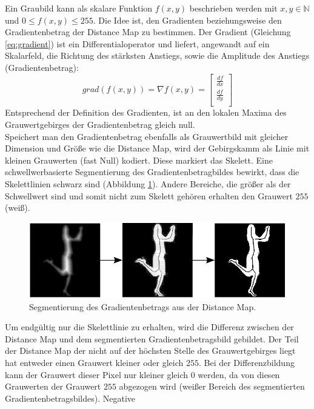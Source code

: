 Ein Graubild kann als skalare Funktion $f(x,y)$ beschrieben werden mit $x,y \in \mathbb{N}$ und
$0 \leq f(x,y) \leq 255$. 
Die Idee ist, den Gradienten beziehungsweise den Gradientenbetrag der Distance Map zu bestimmen. Der Gradient (Gleichung \ref{eq:gradient}) ist ein Differentialoperator und liefert, angewandt auf ein Skalarfeld, die Richtung des stärksten Anstiegs, sowie die Amplitude des Anstiegs (Gradientenbetrag):
\begin{equation}
\label{eq:gradient}
   grad(f(x,y)) = \nabla f(x,y) = \begin{bmatrix}
         \frac{df}{dx}        \\[0.3em]
         \frac{df}{dy} \\[0.3em]
      \end{bmatrix}
\end{equation}
Entsprechend der Definition des Gradienten, ist an den lokalen Maxima des Grauwertgebirges der Gradientenbetrag gleich null.\\
Speichert man den Gradientenbetrag ebenfalls als Grauwertbild mit gleicher Dimension und Größe wie die Distance Map, wird der Gebirgskamm als Linie mit kleinen Grauwerten (fast Null) kodiert. Diese markiert das Skelett. Eine schwellwerbasierte Segmentierung des Gradientenbetragbildes bewirkt, dass die Skelettlinien schwarz sind (Abbildung \ref{fig:bildung_gradient}). Andere Bereiche, die größer als der Schwellwert sind und somit nicht zum Skelett gehören erhalten den Grauwert $255$ (weiß). 
\begin{figure}
\centering
\includegraphics[width=1.0\linewidth]{./fig/bildung_gradient}
\caption{Segmentierung des Gradientenbetrags aus der Distance Map.}
\label{fig:bildung_gradient}
\end{figure}
\FloatBarrier
\noindent
Um endgültig nur die Skelettlinie zu erhalten, wird die Differenz
zwischen der Distance Map und dem segmentierten Gradientenbetragsbild gebildet. Der Teil der Distance Map der nicht
auf der höchsten Stelle des Grauwertgebirges liegt hat entweder einen Grauwert kleiner oder gleich $255$. Bei
der Differenzbildung kann der Grauwert dieser Pixel nur kleiner gleich 0 werden, da von diesen Grauwerten der Grauwert $255$ abgezogen wird (weißer Bereich des segmentierten Gradientenbetragsbildes). Negative
